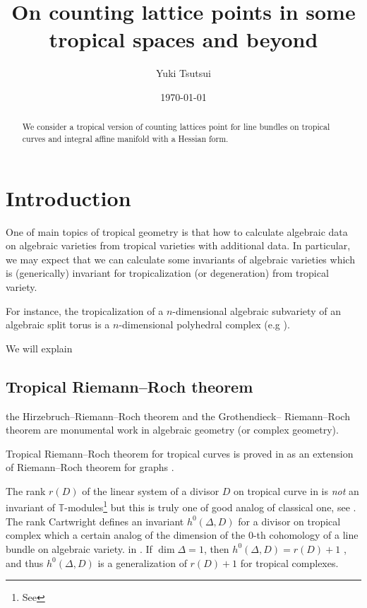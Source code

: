 \documentclass[a4paper,dvipdfmx,reqno,12pt]{amsart}
\title{On counting lattice points in some tropical spaces and beyond
}
\author[Y. Tsutsui]{Yuki Tsutsui}
\date{\today}
\theoremstyle{definition}
\newcommand{\mb}[1]{\mathbb{#1}}%
\numberwithin{equation}{section}
\begin{document}
\begin{abstract}
We consider a tropical version of counting lattices point for 
line bundles on tropical curves and integral affine manifold
with a Hessian form.
\end{abstract}
\maketitle
\section{Introduction}

One of main topics of tropical geometry is that 
how to calculate algebraic data on algebraic varieties
from tropical varieties with additional data.
In particular, we may expect that we can calculate
 some invariants of algebraic varieties
which is (generically) invariant for tropicalization
(or degeneration) from tropical variety.

For instance, the tropicalization of a $n$-dimensional
algebraic subvariety of an algebraic split torus 
is a $n$-dimensional polyhedral complex 
(e.g 
\cite[Theorem 3.2.3]{maclaganIntroductionTropicalGeometry2015a}).

We will explain 

\subsection{Tropical Riemann--Roch theorem}

the Hirzebruch--Riemann--Roch theorem and the Grothendieck--
Riemann--Roch theorem are monumental work in
 algebraic geometry (or complex geometry).

Tropical Riemann--Roch theorem for tropical curves 
is proved in \cite{gathmannRiemannRochTheoremTropical2008a}
as an extension of Riemann--Roch theorem for graphs 
\cite{MR2355607}.

The rank $r(D)$ of the linear system of a divisor $D$ 
on tropical curve in 
\cite{gathmannRiemannRochTheoremTropical2008a}
is \emph{not} an invariant of $\mb{T}$-modules\footnote{
See }
but this is truly one of good analog of classical one,
see \cite[Lemma 2.4]{MR2448666}.
The rank
Cartwright defines an invariant 
$h^{0}(\Delta,D)$ for a divisor on tropical complex
which a certain analog of the dimension of
the $0$-th cohomology of a line bundle on algebraic 
variety.
in \cite[Definition 3.1]{MR4251610}.
If $\dim \Delta=1$, then $h^{0}(\Delta,D)=r(D)+1$
\cite[Proposition 3.3]{MR4251610}, and thus $h^{0}(\Delta,D)$
is a generalization of $r(D)+1$ for tropical complexes. 
\end{document}
